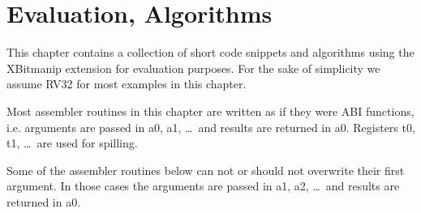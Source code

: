 \chapter{Evaluation, Algorithms}

This chapter contains a collection of short code snippets and algorithms using
the XBitmanip extension for evaluation purposes. For the sake of simplicity we
assume RV32 for most examples in this chapter.

Most assembler routines in this chapter are written as if they were ABI functions,
i.e. arguments are passed in a0, a1, \dots\ and results are returned in a0. Registers
t0, t1, \dots\ are used for spilling.

Some of the assembler routines below can not or should not overwrite their
first argument. In those cases the arguments are passed in a1, a2, \dots\ and
results are returned in a0.

%
%
%
%
%
%
%
%
%
%

